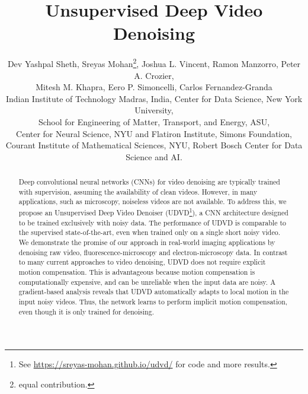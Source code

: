 \documentclass[final]{cvpr}
\begin{document}
\title{Unsupervised Deep Video Denoising}


\author{Dev Yashpal Sheth, \hspace{0.1cm} Sreyas Mohan\thanks{equal contribution.}, \hspace{0.1cm} Joshua L. Vincent, \hspace{0.1cm} Ramon Manzorro, \hspace{0.1cm}Peter A. Crozier, \\Mitesh M. Khapra, \hspace{0.3cm}Eero P. Simoncelli, \hspace{0.3cm}Carlos Fernandez-Granda \vspace{0.2cm} \\ 
Indian Institute of Technology Madras, India, 
Center for Data Science, New York University, \\
School for Engineering of Matter, Transport, and Energy, ASU, \\
Center for Neural Science, NYU and Flatiron Institute, Simons Foundation, \\
Courant Institute of Mathematical Sciences, NYU,
Robert Bosch Center for Data Science and AI.
}




\maketitle


\begin{abstract}

Deep convolutional neural networks (CNNs) for video denoising are typically trained with supervision, assuming the availability of clean videos. However, in many applications, such as microscopy, noiseless videos are not available. To address this, we propose an Unsupervised Deep Video Denoiser (UDVD\footnote{See \href{https://sreyas-mohan.github.io/udvd/}{https://sreyas-mohan.github.io/udvd/} for code and more results.}), a CNN architecture designed to be trained exclusively with noisy data. The performance of UDVD is comparable to the supervised state-of-the-art, even when trained only on a single short noisy video. We demonstrate the promise of our approach in real-world imaging applications by denoising raw video, fluorescence-microscopy and electron-microscopy data. In contrast to many current approaches to video denoising, UDVD does not require explicit motion compensation. This is advantageous because motion compensation is computationally expensive, and can be unreliable when the input data are noisy. A gradient-based analysis reveals that UDVD automatically adapts to local motion in the input noisy videos. Thus, the network learns to perform implicit motion compensation, even though it is only trained for denoising.

\end{abstract}
\end{document}
